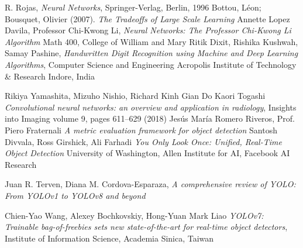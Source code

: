 \documentclass[12pt,a4paper,openright,twoside]{report}
\begin{document}
\begin{thebibliography}{90}             %
\rhead[\fancyplain{}{\bfseries \leftmark}]{\fancyplain{}{\bfseries
\thepage}}
 R. Rojas, \emph{Neural Networks}, Springer-Verlag, Berlin, 1996
 Bottou, Léon; Bousquet, Olivier (2007). \emph{The Tradeoffs of Large Scale Learning}
 Annette Lopez Davila, Professor Chi-Kwong Li, \emph{Neural Networks: The Professor Chi-Kwong Li Algorithm} Math 400, College of William and Mary
 Ritik Dixit, Rishika Kushwah, Samay Pashine, \emph{Handwritten Digit Recognition using Machine and Deep Learning Algorithms}, Computer Science and Engineering
Acropolis Institute of Technology \& Research
Indore, India

Rikiya Yamashita, Mizuho Nishio, Richard Kinh Gian Do Kaori Togashi \emph{Convolutional neural networks: an overview
and application in radiology}, Insights into Imaging volume 9, pages 611–629 (2018)
 Jesús María Romero Riveros, Prof. Piero Fraternali \emph{A metric evaluation framework for object detection}
  Santosh Divvala, Ross Girshick, Ali Farhadi \emph{You Only Look Once: Unified, Real-Time Object Detection} University of Washington, Allen Institute for AI, Facebook AI Research

 Juan R. Terven, Diana M. Cordova-Esparaza, \emph{A comprehensive review of YOLO: From YOLOv1 to YOLOv8 and beyond}

Chien-Yao Wang, Alexey Bochkovskiy, Hong-Yuan Mark Liao \emph{YOLOv7: Trainable bag-of-freebies sets new state-of-the-art for real-time object
detectors}, Institute of Information Science, Academia Sinica, Taiwan


\end{thebibliography}
\end{document}
